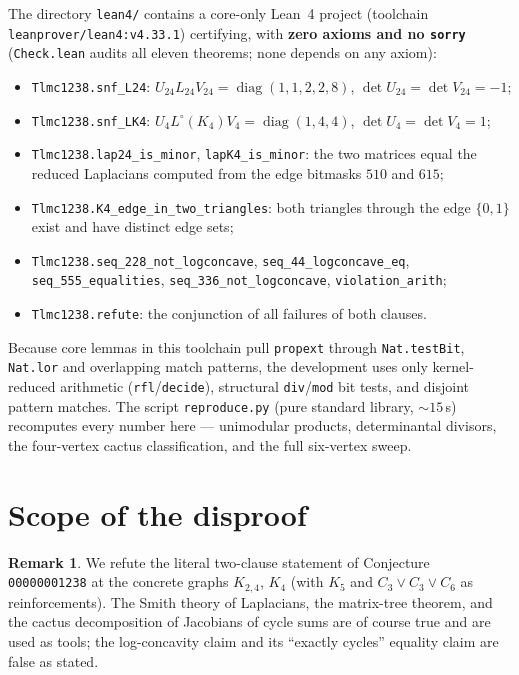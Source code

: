 \documentclass[11pt]{article}
\theoremstyle{definition}
\newtheorem{remark}{Remark}
\begin{document}
The directory \texttt{lean4/} contains a core-only Lean~4 project (toolchain
\texttt{leanprover/lean4:v4.33.1}) certifying, with \textbf{zero axioms and no
\texttt{sorry}} (\texttt{Check.lean} audits all eleven theorems; none depends on any
axiom):
\begin{itemize}
\item \texttt{Tlmc1238.snf\_L24}: $U_{24} L_{24} V_{24} = \operatorname{diag}(1,1,2,2,8)$,
      $\det U_{24} = \det V_{24} = -1$;
\item \texttt{Tlmc1238.snf\_LK4}: $U_4 L^{\circ}(K_4) V_4 = \operatorname{diag}(1,4,4)$,
      $\det U_4 = \det V_4 = 1$;
\item \texttt{Tlmc1238.lap24\_is\_minor}, \texttt{lapK4\_is\_minor}: the two matrices
      equal the reduced Laplacians computed from the edge bitmasks $510$ and $615$;
\item \texttt{Tlmc1238.K4\_edge\_in\_two\_triangles}: both triangles through the edge
      $\{0,1\}$ exist and have distinct edge sets;
\item \texttt{Tlmc1238.seq\_228\_not\_logconcave}, \texttt{seq\_44\_logconcave\_eq},
      \texttt{seq\_555\_equalities}, \texttt{seq\_336\_not\_logconcave},
      \texttt{violation\_arith};
\item \texttt{Tlmc1238.refute}: the conjunction of all failures of both clauses.
\end{itemize}
Because core lemmas in this toolchain pull \texttt{propext} through
\texttt{Nat.testBit}, \texttt{Nat.lor} and overlapping match patterns, the
development uses only kernel-reduced arithmetic (\texttt{rfl}/\texttt{decide}),
structural \texttt{div}/\texttt{mod} bit tests, and disjoint pattern matches.
The script \texttt{reproduce.py} (pure standard library, ${\sim}15$\,s) recomputes
every number here --- unimodular products, determinantal divisors, the
four-vertex cactus classification, and the full six-vertex sweep.

\section{Scope of the disproof}

\begin{remark}
We refute the literal two-clause statement of Conjecture \texttt{00000001238} at the
concrete graphs $K_{2,4}$, $K_4$ (with $K_5$ and $C_3 \vee C_3 \vee C_6$ as
reinforcements).  The Smith theory of Laplacians, the matrix-tree theorem, and the
cactus decomposition of Jacobians of cycle sums are of course true and are used as
tools; the log-concavity claim and its ``exactly cycles'' equality claim are false
as stated.
\end{remark}
\end{document}
